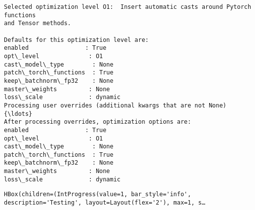 \documentclass[10pt]{article}
\begin{document}
    \begin{Verbatim}[commandchars=\\\{\}]
Selected optimization level O1:  Insert automatic casts around Pytorch functions
and Tensor methods.

Defaults for this optimization level are:
enabled                : True
opt\_level              : O1
cast\_model\_type        : None
patch\_torch\_functions  : True
keep\_batchnorm\_fp32    : None
master\_weights         : None
loss\_scale             : dynamic
Processing user overrides (additional kwargs that are not None){\ldots}
After processing overrides, optimization options are:
enabled                : True
opt\_level              : O1
cast\_model\_type        : None
patch\_torch\_functions  : True
keep\_batchnorm\_fp32    : None
master\_weights         : None
loss\_scale             : dynamic
    \end{Verbatim}

    
    \begin{verbatim}
HBox(children=(IntProgress(value=1, bar_style='info', description='Testing', layout=Layout(flex='2'), max=1, s…
    \end{verbatim}
\end{document}
